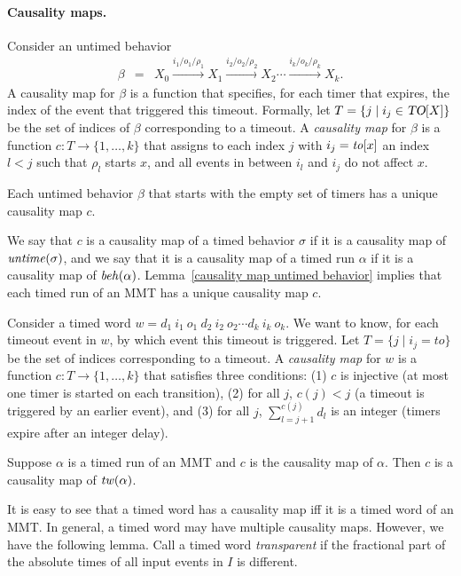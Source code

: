 \paragraph{Causality maps.} 
Consider an untimed behavior
\begin{eqnarray*}
\beta & = & X_0 \xrightarrow{i_1/o_1/\rho_1} X_1  \xrightarrow{i_2/o_2/\rho_2} X_2 \cdots \xrightarrow{i_k/o_k/\rho_k} X_{k}.
\end{eqnarray*}
A causality map for $\beta$ is a function that specifies, for each timer that expires, the index of the event that
triggered this timeout.
Formally, let $T = \{ j \mid i_j \in \mbox{\sl TO}[X] \}$ be the set of indices of $\beta$ corresponding to a timeout.
A \emph{causality map} for $\beta$ is a function $c: T \rightarrow \{ 1 ,\ldots, k \}$ that assigns
to each index $j$ with $i_j = \mathit{to}[x]$ an index $l < j$ such that $\rho_l$ starts $x$, and all events in between $i_l$ and $i_j$
do not affect $x$.

\begin{lemma}
\label{causality map untimed behavior}
Each untimed behavior $\beta$ that starts with the empty set of timers has a unique causality map $c$.
\end{lemma}
We say that $c$ is a causality map of a timed behavior $\sigma$ if it is a causality map of $\mathit{untime}(\sigma)$,
and we say that it is a causality map of a timed run $\alpha$ if it is a causality map of $\mathit{beh}(\alpha)$.
Lemma~\ref{causality map untimed behavior} implies that each timed run of an MMT has a unique causality map $c$.

\fi
Consider a timed word
$w  =   d_1 ~ i_1 ~ o_1 ~ d_2 ~ i_2 ~ o_2 \cdots d_k ~ i_k ~ o_k$.
We want to know, for each timeout event in $w$, by which event this timeout is triggered.
Let $T = \{ j \mid i_j = \mathit{to} \}$ be the set of indices corresponding to a timeout.
A \emph{causality map} for $w$ is a function $c: T \rightarrow \{ 1 ,\ldots, k \}$ that satisfies three conditions:
(1)
$c$ is injective (at most one timer is started on each transition),
(2)
for all $j$, $c(j) < j$ (a timeout is triggered by an earlier event), and
(3)
for all $j$, $\sum_{l=j+1}^{c(j)} d_l$ is an integer (timers expire after an integer delay).
\iflong
\begin{lemma}
\label{causality map run is causility map of its timed word}
Suppose $\alpha$ is a timed run of an MMT and $c$ is the causality map of $\alpha$. 
Then $c$ is a causality map of $\mathit{tw}(\alpha)$.
\end{lemma}
\else
It is easy to see that a timed word has a causality map iff it is a timed word of an MMT.
\fi
In general, a timed word may have multiple causality maps.
\iflong
However, we have the following lemma.
Call a timed word \emph{transparent} if the fractional part of the absolute times of all input events in $I$ is different.

